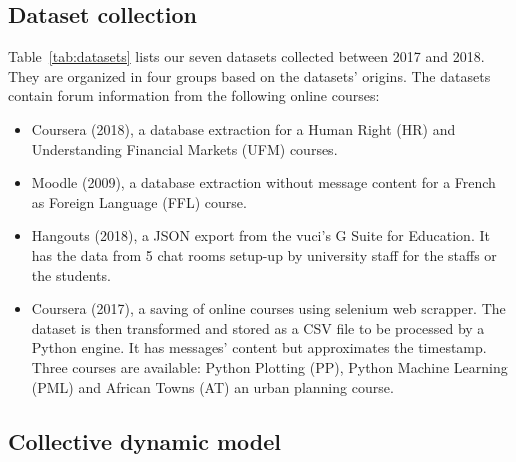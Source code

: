 \documentclass[a4paper,twoside]{article}
\begin{document}
\subsection{Dataset collection}
Table~\ref{tab:datasets} lists our seven datasets collected between 2017 and 2018.  They are organized in four groups based on the datasets' origins.
The datasets contain forum information from the following online courses:
\begin{itemize}
\item Coursera (2018), a database extraction for a Human Right (HR) and Understanding Financial Markets (UFM) courses.
\item Moodle (2009), a database extraction without message content for a French as Foreign Language (FFL) course.
\item Hangouts (2018), a JSON export from the \gls{vuci}'s G Suite for Education.  It has the data from 5 chat rooms setup-up by university staff for the staffs or the students.
\item Coursera (2017), a saving of online courses using selenium web scrapper.  The dataset is then transformed and stored as a CSV file to be processed by a Python engine.  It has messages' content but approximates the timestamp.  Three courses are available: Python Plotting (PP), Python Machine Learning (PML) and African Towns (AT) an urban planning course.
\end{itemize}

\subsection{Collective dynamic model}
\end{document}
